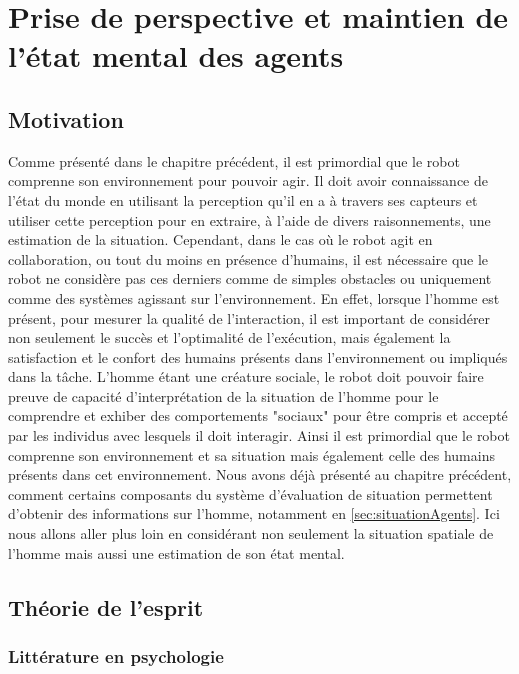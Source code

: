 \documentclass[a4paper,11pt,twoside]{StyleThese}
\begin{document}
\setcounter{chapter}{2} %
\dominitoc
\faketableofcontents
\fi

\chapter{Prise de perspective et maintien de l'état mental des agents}
\label{chapter2}
\minitoc

\section{Motivation}
\label{sec:motivation}
Comme présenté dans le chapitre précédent, il est primordial que le robot comprenne son environnement pour pouvoir agir. Il doit avoir connaissance de l'état du monde en utilisant la perception qu'il en a à travers ses capteurs et utiliser cette perception pour en extraire, à l'aide de divers raisonnements, une estimation de la situation. Cependant, dans le cas où le robot agit en collaboration, ou tout du moins en présence d'humains, il est nécessaire que le robot ne considère pas ces derniers comme de simples obstacles ou uniquement comme des systèmes agissant sur l'environnement. En effet, lorsque l'homme est présent, pour mesurer la qualité de l'interaction, il est important de considérer non seulement le succès et l'optimalité de l'exécution, mais également la satisfaction et le confort des humains présents dans l'environnement ou impliqués dans la tâche. L'homme étant une créature sociale, le robot doit pouvoir faire preuve de capacité d'interprétation de la situation de l'homme pour le comprendre et exhiber des comportements "sociaux" pour être compris et accepté par les individus avec lesquels il doit interagir.
Ainsi il est primordial que le robot comprenne son environnement et sa situation mais également celle des humains présents dans cet environnement.
Nous avons déjà présenté au chapitre précédent, comment certains composants du système d'évaluation de situation permettent d'obtenir des informations sur l'homme, notamment en \ref{sec:situationAgents}. Ici nous allons aller plus loin en considérant non seulement la situation spatiale de l'homme mais aussi une estimation de son état mental.

\section{Théorie de l'esprit}
\subsection{Littérature en psychologie}
\label{sec:psy}
\end{document}
